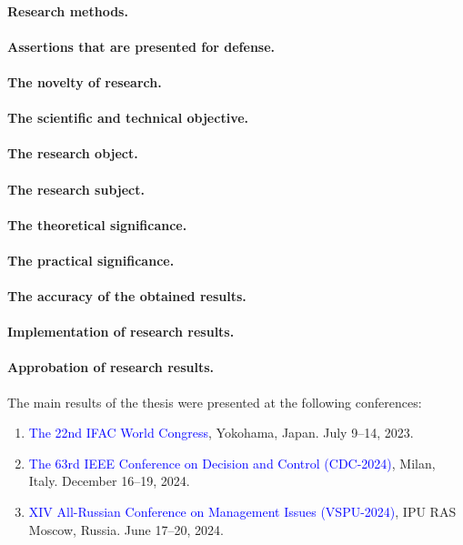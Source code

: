 \paragraph*{Research methods.}
\paragraph*{Assertions that are presented for defense.}
\paragraph*{The novelty of research.}
\paragraph*{The scientific and technical objective.}
\paragraph*{The research object.}
\paragraph*{The research subject.}
\paragraph*{The theoretical significance.}
\paragraph*{The practical significance.}
\paragraph*{The accuracy of the obtained results.}

\paragraph*{Implementation of research results.}
\paragraph*{Approbation of research results.}
The main results of the thesis were presented at the following conferences:
\begin{enumerate}
	\item \textcolor{blue}{The 22nd IFAC World Congress}, Yokohama, Japan.  July 9--14, 2023.
	\item \textcolor{blue}{The 63rd IEEE Conference on Decision and Control (CDC-2024)}, Milan, Italy. December 16--19, 2024.
	\item \textcolor{blue}{XIV All-Russian Conference on Management Issues (VSPU-2024)}, IPU RAS Moscow, Russia. June 17--20, 2024.
\end{enumerate}
